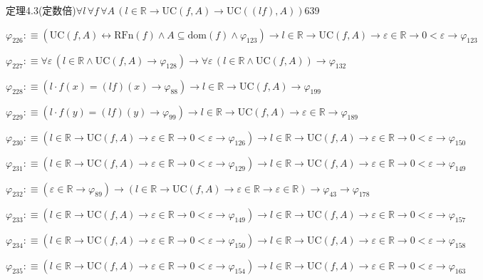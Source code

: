 \begin{fullproof}{定理4.3(定数倍)}{$\forall l\,\forall f\,\forall A\,(l \in \mathbb{R} \to \mathrm{UC}(f,A) \to \mathrm{UC}((l f),A))$}{639}
\begin{abbrevlist}
\item $\varphi_{226} :\equiv (\mathrm{UC}(f,A) \leftrightarrow \mathrm{RFn}(f) \land A \subseteq \mathrm{dom}(f) \land \varphi_{123}) \to l \in \mathbb{R} \to \mathrm{UC}(f,A) \to \varepsilon \in \mathbb{R} \to 0 < \varepsilon \to \varphi_{123}$
\item $\varphi_{227} :\equiv \forall \varepsilon\,(l \in \mathbb{R} \land \mathrm{UC}(f,A) \to \varphi_{128}) \to \forall \varepsilon\,(l \in \mathbb{R} \land \mathrm{UC}(f,A)) \to \varphi_{132}$
\item $\varphi_{228} :\equiv (l \cdot f(x) = (l f)(x) \to \varphi_{88}) \to l \in \mathbb{R} \to \mathrm{UC}(f,A) \to \varphi_{199}$
\item $\varphi_{229} :\equiv (l \cdot f(y) = (l f)(y) \to \varphi_{99}) \to l \in \mathbb{R} \to \mathrm{UC}(f,A) \to \varepsilon \in \mathbb{R} \to \varphi_{189}$
\item $\varphi_{230} :\equiv (l \in \mathbb{R} \to \mathrm{UC}(f,A) \to \varepsilon \in \mathbb{R} \to 0 < \varepsilon \to \varphi_{126}) \to l \in \mathbb{R} \to \mathrm{UC}(f,A) \to \varepsilon \in \mathbb{R} \to 0 < \varepsilon \to \varphi_{150}$
\item $\varphi_{231} :\equiv (l \in \mathbb{R} \to \mathrm{UC}(f,A) \to \varepsilon \in \mathbb{R} \to 0 < \varepsilon \to \varphi_{129}) \to l \in \mathbb{R} \to \mathrm{UC}(f,A) \to \varepsilon \in \mathbb{R} \to 0 < \varepsilon \to \varphi_{149}$
\item $\varphi_{232} :\equiv (\varepsilon \in \mathbb{R} \to \varphi_{89}) \to (l \in \mathbb{R} \to \mathrm{UC}(f,A) \to \varepsilon \in \mathbb{R} \to \varepsilon \in \mathbb{R}) \to \varphi_{43} \to \varphi_{178}$
\item $\varphi_{233} :\equiv (l \in \mathbb{R} \to \mathrm{UC}(f,A) \to \varepsilon \in \mathbb{R} \to 0 < \varepsilon \to \varphi_{149}) \to l \in \mathbb{R} \to \mathrm{UC}(f,A) \to \varepsilon \in \mathbb{R} \to 0 < \varepsilon \to \varphi_{157}$
\item $\varphi_{234} :\equiv (l \in \mathbb{R} \to \mathrm{UC}(f,A) \to \varepsilon \in \mathbb{R} \to 0 < \varepsilon \to \varphi_{150}) \to l \in \mathbb{R} \to \mathrm{UC}(f,A) \to \varepsilon \in \mathbb{R} \to 0 < \varepsilon \to \varphi_{158}$
\item $\varphi_{235} :\equiv (l \in \mathbb{R} \to \mathrm{UC}(f,A) \to \varepsilon \in \mathbb{R} \to 0 < \varepsilon \to \varphi_{154}) \to l \in \mathbb{R} \to \mathrm{UC}(f,A) \to \varepsilon \in \mathbb{R} \to 0 < \varepsilon \to \varphi_{163}$

\end{abbrevlist}
\end{fullproof}
